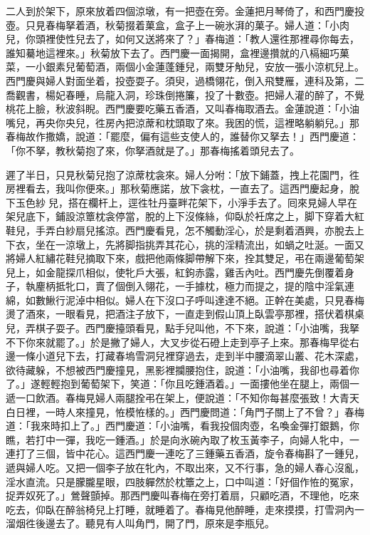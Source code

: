 二人到於架下，原來放着四個涼墩，有一把壺在旁。金蓮把月琴倚了，{}和西門慶投壺。只見春梅拏着酒，秋菊掇着菓盒，盒子上一碗氷湃的菓子。婦人道：「小肉兒，你頭裡使性兒去了，如何又送將來了？」春梅道：「教人還徃那裡尋你每去，誰知驀地這裡來。」秋菊放下去了。西門慶一面揭開，盒裡邊攢就的八槅細巧菓菜，一小銀素兒葡萄酒，兩個小金蓮蓬鍾兒，兩雙牙觔兒，安放一張小涼杌兒上。西門慶與婦人對面坐着，投壺耍子。須臾，過橋翎花，倒入飛雙雁，連科及第，二喬觀書，楊妃春睡，烏龍入洞，珍珠倒捲簾，投了十數壺。把婦人灌的醉了，不覺桃花上臉，秋波斜睨。西門慶要吃藥五香酒，又叫春梅取酒去。金蓮說道：「小油嘴兒，再央你央兒，{}徃房內把涼蓆和枕頭取了來。我困的慌，這裡略躺躺兒。」那春梅故作撒嬌，說道：「罷麼，偏有這些支使人的，誰替你又拏去！」西門慶道：「你不拏，{}教秋菊抱了來，你拏酒就是了。」那春梅搖着頭兒去了。

遲了半日，只見秋菊兒抱了涼蓆枕衾來。婦人分咐：「放下鋪蓋，拽上花園門，徃房裡看去，我叫你便來。」那秋菊應諾，放下衾枕，一直去了。這西門慶起身，脫下玉色紗𧜽兒，搭在欄杆上，逕徃牡丹臺畔花架下，小淨手去了。囘來見婦人早在架兒底下，鋪設涼簟枕衾停當，脫的上下沒條絲，仰臥於衽席之上，脚下穿着大紅鞋兒，手弄白紗扇兒搖涼。西門慶看見，怎不觸動淫心，於是剩着酒興，亦脫去上下衣，坐在一涼墩上，先將脚指挑弄其花心，挑的淫精流出，如蝸之吐涎。一面又將婦人紅繡花鞋兒摘取下來，戲把他兩條脚帶解下來，拴其雙足，弔在兩邊葡萄架兒上，如金龍探爪相似，使牝戶大張，紅鉤赤露，雞舌內吐。西門慶先倒覆着身子，執麈柄抵牝口，賣了個倒入翎花，一手據枕，極力而提之，提的陰中淫氣連綿，如數鰍行泥淖中相似。婦人在下沒口子呼叫達達不絕。正幹在美處，只見春梅燙了酒來，一眼看見，把酒注子放下，一直走到假山頂上臥雲亭那裡，搭伏着棋桌兒，弄棋子耍子。西門慶擡頭看見，點手兒叫他，不下來，說道：「小油嘴，我拏不下你來就罷了。」於是撇了婦人，大叉步從石磴上走到亭子上來。那春梅早從右邊一條小道兒下去，打藏春塢雪洞兒裡穿過去，走到半中腰滴翠山叢、花木深處，欲待藏躲，{}不想被西門慶撞見，黑影裡攔腰抱住，說道：「小油嘴，我卻也尋着你了。」遂輕輕抱到葡萄架下，笑道：「你且吃鍾酒着。」一面摟他坐在腿上，兩個一遞一口飲酒。春梅見婦人兩腿拴弔在架上，便說道：「不知你每甚麼張致！大青天白日裡，一時人來撞見，恠模恠樣的。」西門慶問道：「角門子關上了不曾？」春梅道：「我來時扣上了。」西門慶道：「小油嘴，看我投個肉壺，名喚金彈打銀鵝，你瞧，若打中一彈，我吃一鍾酒。」於是向氷碗內取了枚玉黃李子，向婦人牝中，一連打了三個，皆中花心。{}這西門慶一連吃了三鍾藥五香酒，旋令春梅斟了一鍾兒，遞與婦人吃。又把一個李子放在牝內，不取出來，又不行事，急的婦人春心沒亂，淫水直流。只是朦朧星眼，四肢軃然於枕簟之上，{}口中叫道：「好個作恠的冤家，捉弄奴死了。」鶯聲顫掉。那西門慶叫春梅在旁打着扇，只顧吃酒，不理他，{}吃來吃去，仰臥在醉翁椅兒上打睡，就睡着了。{}春梅見他醉睡，走來摸摸，打雪洞內一溜烟徃後邊去了。聽見有人叫角門，開了門，原來是李瓶兒。{}

